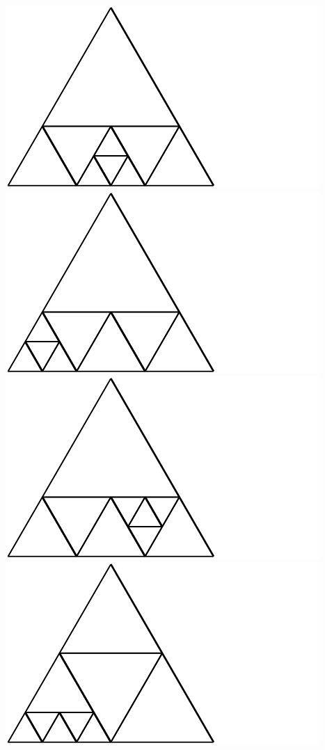 \documentclass[12pt,amstags,fleqn]{article}
\theoremstyle{plain}
\theoremstyle{definition}
\begin{document}
\includegraphics{output-dissections-dissection9_i10_r0_c2.pdf}
\includegraphics{output-dissections-dissection9_i10_r0_c3.pdf}
\includegraphics{output-dissections-dissection9_i10_r2_c2.pdf}
\includegraphics{output-dissections-dissection9_i11_r0_c3.pdf}
\end{document}
